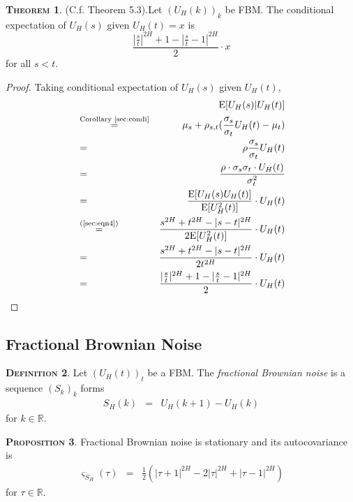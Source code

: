 \documentclass[a4paper, twoside, 11pt]{article}
\theoremstyle{definition}
\newtheorem{definition}{\scshape Definition}[section]
\newtheorem{theorem}[definition]{\scshape Theorem}
\newtheorem{proposition}[definition]{\scshape Proposition}
\begin{document}
\begin{theorem}
  (C.f. \cite{mandelbrot} Theorem 5.3).Let $(U_H(k))_{k}$ be FBM. The conditional expectation of $U_H(s)$  given $U_H(t)=x$ is
\begin{equation*}
  \frac{|\frac{s}{t}|^{2H} + 1 - |\frac{s}{t} - 1|^{2H}}{2} \cdot x
\end{equation*}
for all $ s < t$.
\end{theorem}
\begin{proof}
  Taking conditional expectation of $U_H(s)$ given $U_H(t)$,
  \begin{eqnarray*}
  &&\mathrm{E}[U_H(s)|U_H(t)]\\
  &\overset{\text{Corollary \ref{sec:condi}}}{=}& \mu_s + \rho_{s,t} (\frac{\sigma_s}{\sigma_t}U_H(t) - \mu_t)\\
  &=& \rho\frac{\sigma_s}{\sigma_t}U_H(t)\\
  &=& \frac{\rho\cdot\sigma_s\sigma_t\cdot U_H(t)}{\sigma_t^2}\\
  &=& \frac{\mathrm{E}[U_H(s)U_H(t)]}{\mathrm{E}[U_H^2(t)]} \cdot U_H(t)\\
  &\overset{\text{(\ref{sec:eqn4})}}{=}& \frac{s^{2H} + t^{2H} - |s-t|^{2H}}{2\mathrm{E}[U_H^2(t)]}\cdot U_H(t)\\
  &=&  \frac{s^{2H} + t^{2H} - |s-t|^{2H}}{2t^{2H}}\cdot U_H(t)\\
  &=& \frac{|\frac{s}{t}|^{2H} + 1 - |\frac{s}{t} - 1|^{2H}}{2} \cdot U_H(t)
  \end{eqnarray*}
\end{proof}

\subsection{Fractional Brownian Noise}
\begin{definition}
  Let $(U_H(t))_t$ be a FBM. The \emph{fractional Brownian noise} is a sequence $(S_k)_k$ forms
\begin{eqnarray*}
  S_H(k) &=& U_H(k+1) - U_H(k)
\end{eqnarray*}
for $k \in \mathbb{R}$.
\end{definition}

\begin{proposition}
  Fractional Brownian noise is stationary and its autocovariance is 
  \begin{eqnarray}
	\varsigma_{S_H}(\tau) &=&  \frac{1}{2} (|\tau + 1|^{2H} - 2|\tau|^{2H} + |\tau-1|^{2H})
  \label{sec:auto}
  \end{eqnarray}
  for $\tau \in \mathbb{R}$.
\end{proposition}
\end{document}
